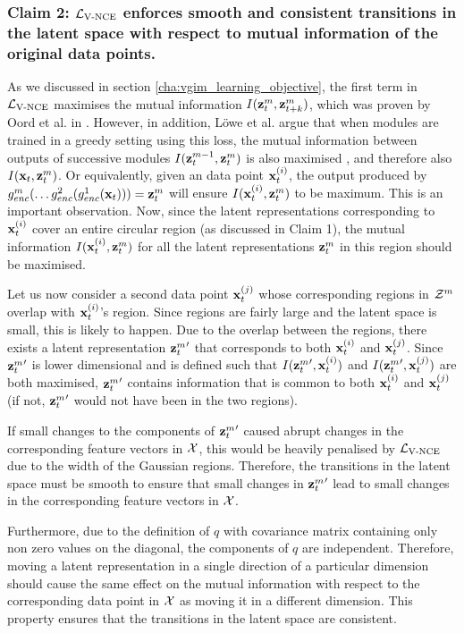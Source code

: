 	
		\subsubsection{Claim 2: $\mathcal{L}_{\text{V-NCE}}$ enforces smooth and consistent transitions in the latent space with respect to mutual information of the original data points.}
			As we discussed in section \ref{cha:vgim_learning_objective}, the first term in $\mathcal{L}_{\text{V-NCE}}$ maximises the mutual information $I(\mathbf{z}_t^{m}, \mathbf{z}_{t+k}^m)$, which was proven by Oord et al. in \cite{oordRepresentationLearningContrastive2019}. However, in addition, Löwe et al. argue that when modules are trained in a greedy setting using this loss, the mutual information between outputs of successive modules $I(\mathbf{z}_t^{m-1}, \mathbf{z}_t^{m})$ is also maximised \cite{lowePuttingEndEndtoEnd2020}, and therefore also $I(\mathbf{x}_t, \mathbf{z}_t^{m})$. Or equivalently, given an data point $\mathbf{x}_t^{(i)}$, the output produced by $ g_{enc}^m ( \dots	g_{enc}^2(g_{enc}^1(\mathbf{x}_t))) = \mathbf{z}_t^m$ will ensure $I(\mathbf{x}_t^{(i)}, \mathbf{z}_t^{m})$ to be maximum. This is an important observation. Now, since the latent representations corresponding to $\mathbf{x}_t^{(i)}$ cover an entire circular region (as discussed in Claim 1), the mutual information $I(\mathbf{x}_t^{(i)}, \mathbf{z}_t^{m})$ for all the latent representations $\mathbf{z}_t^{m}$ in this region should be maximised.
			
			Let us now consider a second data point $\mathbf{x}_t^{(j)}$ whose corresponding regions in $\mathcal{Z}^m$ overlap with $\mathbf{x}_t^{(i)}$'s region. Since regions are fairly large and the latent space is small, this is likely to happen. Due to the overlap between the regions, there exists a latent representation ${\mathbf{z}_t^{m}}'$ that corresponds to both $\mathbf{x}_t^{(i)}$ and $\mathbf{x}_t^{(j)}$. 
			Since ${\mathbf{z}_t^{m}}'$ is lower dimensional and is defined such that $I({\mathbf{z}_t^{m}}', \mathbf{x}_t^{(i)})$ and $I({\mathbf{z}_t^{m}}', \mathbf{x}_t^{(j)})$ are both maximised, ${\mathbf{z}_t^{m}}'$ contains information that is common to both $\mathbf{x}_t^{(i)}$ and $\mathbf{x}_t^{(j)}$ (if not, ${\mathbf{z}_t^{m}}'$ would not have been in the two regions).
			
			If small changes to the components of ${\mathbf{z}_t^{m}}'$ caused abrupt changes in the corresponding feature vectors in $\mathcal{X}$, this would be heavily penalised by $\mathcal{L}_{\text{V-NCE}}$ due to the width of the Gaussian regions. Therefore, the transitions in the latent space must be smooth to ensure that small changes in ${\mathbf{z}_t^{m}}'$ lead to small changes in the corresponding feature vectors in $\mathcal{X}$.
			
			Furthermore, due to the definition of $q$ with covariance matrix containing only non zero values on the diagonal, the components of $q$ are independent. Therefore, moving a latent representation in a single direction of a particular dimension should cause the same effect on the mutual information with respect to the corresponding data point in $\mathcal{X}$ as moving it in a different dimension. This property ensures that the transitions in the latent space are consistent.
							
